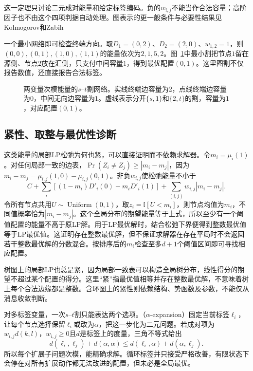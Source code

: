 这一定理只讨论二元成对能量和给定标签编码。负的$w_{i,j}$不能当作合法容量；高阶因子也不由这个四项判据自动处理。图表示的更一般条件与必要性结果见Kolmogorov和Zabih

一个最小网络即可检查终端方向。取$D_1=(0,2)$、$D_2=(2,0)$、$w_{1,2}=1$，则$(0,0),(0,1),(1,0),(1,1)$的能量依次为$2,1,5,2$。图~\ref{fig:pgm-variational-cut}中最小割把节点$1$留在源侧、节点$2$放在汇侧，只支付中间容量$1$，得到最优配置$(0,1)$。这里图割不仅报告数值，还直接报告合法标签。

\begin{figure}[htbp]
  \centering
  
  \caption{两变量次模能量的$s$--$t$割网络。实线终端边容量为$2$，点线终端边容量为$0$，中间无向边容量为$1$。虚线表示分开$\{s,1\}$和$\{2,t\}$的割，容量为$1$，对应配置$(0,1)$。}
  \label{fig:pgm-variational-cut}
\end{figure}

\subsection{紧性、取整与最优性诊断}
\label{sec:pgm-variational-tightness-rounding}

这类能量的局部LP松弛为何也紧，可以直接证明而不依赖求解器。令$m_i=\mu_i(1)$。对任何局部一致的边表，$\Pr(Z_i\ne Z_j)\geq|m_i-m_j|$，因为$m_i-m_j=\mu_{i,j}(1,0)-\mu_{i,j}(0,1)$。非负$w_{i,j}$使松弛能量不小于
\[
  C+\sum_i[(1-m_i)D'_i(0)+m_iD'_i(1)]
       +\sum_{(i,j)}w_{i,j}|m_i-m_j|.
\]
令所有节点共用$U\sim\operatorname{Uniform}(0,1)$，取$z_i=\mathbb I[U<m_i]$，则节点均值为$m_i$，不同值概率恰为$|m_i-m_j|$。这个全局分布的期望能量等于上式，所以至少有一个阈值配置的能量不高于原LP解。用于LP最优解时，结合松弛下界便得到整数最优值等于LP最优值。这证明存在整数最优解，但不保证求解器在存在平局时不会返回若干整数最优解的分数混合。按排序后的$m_i$检查至多$d+1$个阈值区间即可寻找相应配置。

树图上的局部LP也总是紧，因为局部一致表可以构造全局树分布，线性得分的期望不超过某个配置的得分。这里“紧”指最优值相等并存在整数最优解，不意味着树上每个合法边缘都是整数。含环图上的紧性则依赖结构、势函数及参数，不能仅从消息收敛判断。

对多标签变量，一次$s$--$t$割只能表达两个选项。（$\alpha$-expansion）固定当前标签$\ell_i$，让每个节点选择保留$\ell_i$或改为$\alpha$，把这一步化为二元问题。若成对项为$w_{i,j}d(k,l)$，$w_{i,j}\geq0$且$d$是标签上的度量，三角不等式给出
\[
  d(\ell_i,\ell_j)+d(\alpha,\alpha)
    \leq d(\ell_i,\alpha)+d(\alpha,\ell_j).
\]
所以每个扩展子问题次模，能精确求解。循环标签并只接受严格改善，有限状态下会停在对所有扩展动作都无法改进的配置，但未必是全局最优。


